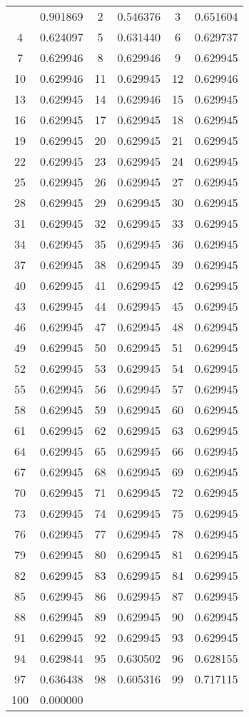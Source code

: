 \documentclass[12pt]{article}
\begin{document}
\begin{longtable}{@{}cc|cc|cc@{}}
\bottomrule
\endlastfoot
1 & 0.901869 & 2 & 0.546376 & 3 & 0.651604 \\
4 & 0.624097 & 5 & 0.631440 & 6 & 0.629737 \\
7 & 0.629946 & 8 & 0.629946 & 9 & 0.629945 \\
10 & 0.629946 & 11 & 0.629945 & 12 & 0.629946 \\
13 & 0.629945 & 14 & 0.629946 & 15 & 0.629945 \\
16 & 0.629945 & 17 & 0.629945 & 18 & 0.629945 \\
19 & 0.629945 & 20 & 0.629945 & 21 & 0.629945 \\
22 & 0.629945 & 23 & 0.629945 & 24 & 0.629945 \\
25 & 0.629945 & 26 & 0.629945 & 27 & 0.629945 \\
28 & 0.629945 & 29 & 0.629945 & 30 & 0.629945 \\
31 & 0.629945 & 32 & 0.629945 & 33 & 0.629945 \\
34 & 0.629945 & 35 & 0.629945 & 36 & 0.629945 \\
37 & 0.629945 & 38 & 0.629945 & 39 & 0.629945 \\
40 & 0.629945 & 41 & 0.629945 & 42 & 0.629945 \\
43 & 0.629945 & 44 & 0.629945 & 45 & 0.629945 \\
46 & 0.629945 & 47 & 0.629945 & 48 & 0.629945 \\
49 & 0.629945 & 50 & 0.629945 & 51 & 0.629945 \\
52 & 0.629945 & 53 & 0.629945 & 54 & 0.629945 \\
55 & 0.629945 & 56 & 0.629945 & 57 & 0.629945 \\
58 & 0.629945 & 59 & 0.629945 & 60 & 0.629945 \\
61 & 0.629945 & 62 & 0.629945 & 63 & 0.629945 \\
64 & 0.629945 & 65 & 0.629945 & 66 & 0.629945 \\
67 & 0.629945 & 68 & 0.629945 & 69 & 0.629945 \\
70 & 0.629945 & 71 & 0.629945 & 72 & 0.629945 \\
73 & 0.629945 & 74 & 0.629945 & 75 & 0.629945 \\
76 & 0.629945 & 77 & 0.629945 & 78 & 0.629945 \\
79 & 0.629945 & 80 & 0.629945 & 81 & 0.629945 \\
82 & 0.629945 & 83 & 0.629945 & 84 & 0.629945 \\
85 & 0.629945 & 86 & 0.629945 & 87 & 0.629945 \\
88 & 0.629945 & 89 & 0.629945 & 90 & 0.629945 \\
91 & 0.629945 & 92 & 0.629945 & 93 & 0.629945 \\
94 & 0.629844 & 95 & 0.630502 & 96 & 0.628155 \\
97 & 0.636438 & 98 & 0.605316 & 99 & 0.717115 \\
100 & 0.000000 &  &  &  &  \\

\end{longtable}
\end{document}
